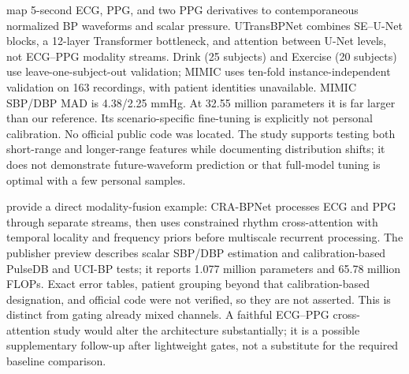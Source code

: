 \documentclass[11pt]{article}
\begin{document}
\citet{zheng2025utrans} map 5-second ECG, PPG, and two PPG derivatives to contemporaneous normalized BP waveforms and scalar pressure. UTransBPNet combines SE--U-Net blocks, a 12-layer Transformer bottleneck, and attention between U-Net levels, not ECG--PPG modality streams. Drink (25 subjects) and Exercise (20 subjects) use leave-one-subject-out validation; MIMIC uses ten-fold instance-independent validation on 163 recordings, with patient identities unavailable. MIMIC SBP/DBP MAD is 4.38/2.25 mmHg. At 32.55 million parameters it is far larger than our reference. Its scenario-specific fine-tuning is explicitly not personal calibration. No official public code was located. The study supports testing both short-range and longer-range features while documenting distribution shifts; it does not demonstrate future-waveform prediction or that full-model tuning is optimal with a few personal samples.

\citet{jin2026cra} provide a direct modality-fusion example: CRA-BPNet processes ECG and PPG through separate streams, then uses constrained rhythm cross-attention with temporal locality and frequency priors before multiscale recurrent processing. The publisher preview describes scalar SBP/DBP estimation and calibration-based PulseDB and UCI-BP tests; it reports 1.077 million parameters and 65.78 million FLOPs. Exact error tables, patient grouping beyond that calibration-based designation, and official code were not verified, so they are not asserted. This is distinct from gating already mixed channels. A faithful ECG--PPG cross-attention study would alter the architecture substantially; it is a possible supplementary follow-up after lightweight gates, not a substitute for the required baseline comparison.
\end{document}
